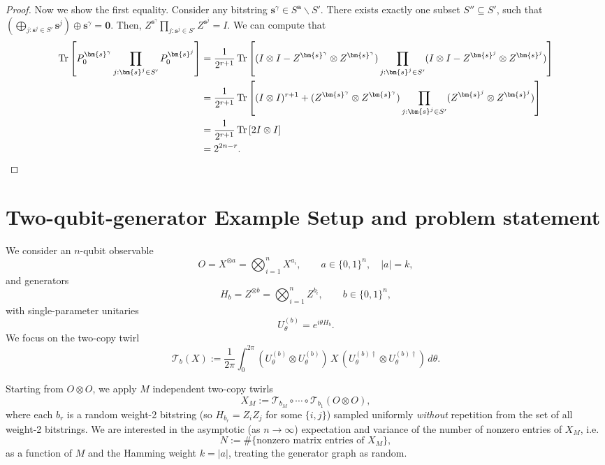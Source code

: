 \documentclass[a4paper,onecolumn,notitlepage,nofootinbib,longbibliography,superscriptaddress, floatfix, pra, aps, 10pt]{revtex4-2}
\newcommand{\vta}{{\bm{a}}}
\newcommand{\vtsj}{{\bm{s}^j}}
\newcommand{\vts}{{\bm{s}}}
\begin{document}
\begin{proof}
Now we show the first equality. Consider any bitstring $\vts^\gamma \in S^\vta \backslash S'$. There exists exactly one subset $S'' \subseteq S'$, such that $\left(\bigoplus_{j:\vtsj \in S'} \vtsj \right) \oplus \vts^\gamma = \mathbf{0}$. Then, $Z^{\vts^\gamma} \prod_{j:\vtsj \in S'}Z^{\vtsj} = I$. We can compute that 
\begin{align}
\Tr\left[P_0^{\vts^\gamma}\prod_{j:\vtsj \in S'} P_0^\vtsj\right] &= \frac{1}{2^{r+1}}\Tr\left[(I\otimes I - Z^{\vts^\gamma}\otimes Z^{\vts^\gamma})\prod_{j:\vtsj \in S'}(I\otimes I - Z^{\vtsj}\otimes Z^{\vtsj})\right] 
\\&= \frac{1}{2^{r+1}}\Tr\left[(I\otimes I)^{r+1} + (Z^{\vts^\gamma}\otimes Z^{\vts^\gamma})\prod_{j:\vtsj \in S'}(Z^{\vtsj}\otimes Z^{\vtsj})\right] \\ &= \frac{1}{2^{r+1}} \Tr\left[2I\otimes I\right] \\ &= 
2^{2n-r}. 
\end{align}
\end{proof}



\section{Two-qubit-generator Example Setup and problem statement}

We consider an $n$-qubit observable
\begin{equation}
  O = X^{\otimes a} = \bigotimes_{i=1}^n X^{a_i}, 
  \qquad a\in\{0,1\}^n,\quad |a| = k,
\end{equation}
and generators
\begin{equation}
  H_b = Z^{\otimes b} = \bigotimes_{i=1}^n Z^{b_i}, 
  \qquad b\in\{0,1\}^n,
\end{equation}
with single-parameter unitaries
\begin{equation}
  U_\theta^{(b)} = e^{i\theta H_b}.
\end{equation}
We focus on the two-copy twirl
\begin{equation}
  \mathcal{T}_b(X) 
  := \frac{1}{2\pi}\int_0^{2\pi} 
  (U_\theta^{(b)}\otimes U_\theta^{(b)})\,X\,
  (U_\theta^{(b)\dagger}\otimes U_\theta^{(b)\dagger})\,d\theta.
\end{equation}

Starting from $O\otimes O$, we apply $M$ independent two-copy twirls
\begin{equation}
  X_M 
  := \mathcal{T}_{b_M}\circ\cdots\circ\mathcal{T}_{b_1}(O\otimes O),
\end{equation}
where each $b_r$ is a random weight-2 bitstring (so $H_{b_r}=Z_iZ_j$ for some $\{i,j\}$) sampled uniformly \emph{without} repetition from the set of all weight-2 bitstrings. We are interested in the asymptotic (as $n\to\infty$) expectation and variance of the number of nonzero entries of $X_M$, i.e.
\begin{equation}
  N := \#\{\text{nonzero matrix entries of }X_M\},
\end{equation}
as a function of $M$ and the Hamming weight $k=|a|$, treating the generator graph as random.
\end{document}
